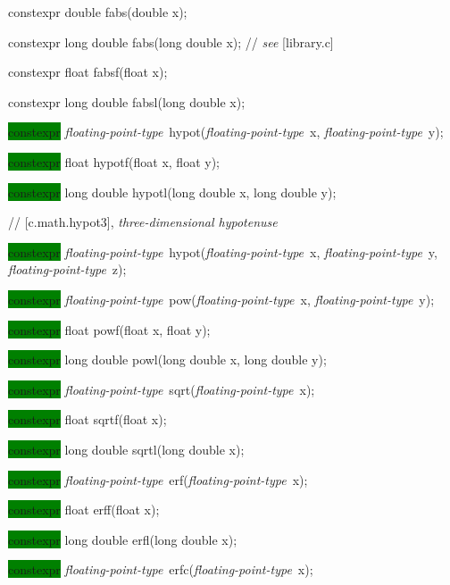 \documentclass[prd,twocolumn,amsmath,amssymb,nofootinbib,eqsecnum]{revtex4-1}
\newcommand{\highlight}[1]{\colorbox{green}{\!\!\!\! #1}}
\newcommand{\oldhighlight}[1]{#1}
\newcommand{\stdcomment}[1]{{// {\it see} [#1]}}
\newcommand{\fptype}{{\it floating-point-type}}
\begin{document}
{\oldhighlight{constexpr} double fabs(double x);

\oldhighlight{constexpr} long double fabs(long double x); \stdcomment{library.c}

\oldhighlight{constexpr} float fabsf(float x);

\oldhighlight{constexpr} long double fabsl(long double x);

\vspace{2ex}


\highlight{constexpr} \fptype\ hypot(\fptype\ x, \fptype\ y); 

\highlight{constexpr} float hypotf(float x, float y);

\highlight{constexpr} long double hypotl(long double x, long double y);

\vspace{2ex}

// [c.math.hypot3], {\it three-dimensional hypotenuse}


\highlight{constexpr} \fptype\ hypot(\fptype\ x, \fptype\ y, \fptype\ z);

\vspace{2ex}

\highlight{constexpr} \fptype\ pow(\fptype\ x, \fptype\ y); 

\highlight{constexpr} float powf(float x, float y);

\highlight{constexpr} long double powl(long double x, long double y);

\vspace{2ex}


\highlight{constexpr} \fptype\ sqrt(\fptype\ x);

\highlight{constexpr} float sqrtf(float x);

\highlight{constexpr} long double sqrtl(long double x);

\vspace{2ex}


\highlight{constexpr} \fptype\ erf(\fptype\ x);

\highlight{constexpr} float erff(float x);

\highlight{constexpr} long double erfl(long double x);

\vspace{2ex}

\highlight{constexpr} \fptype\ erfc(\fptype\ x);

}
\end{document}
